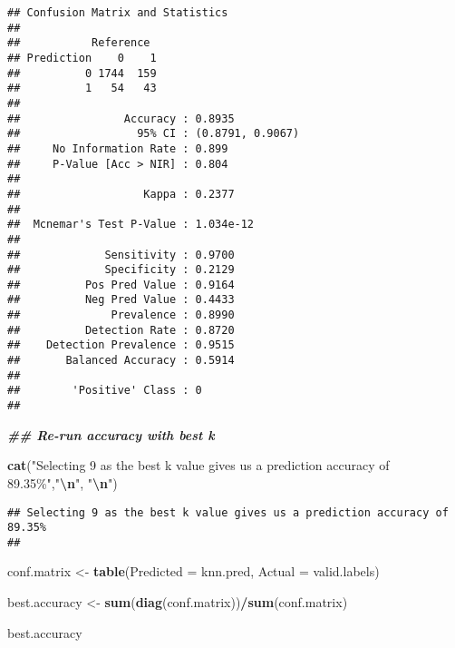 \documentclass[
]{article}
\newenvironment{Shaded}{\begin{snugshade}}{\end{snugshade}}
\newcommand{\AttributeTok}[1]{\textcolor[rgb]{0.13,0.29,0.53}{#1}}
\newcommand{\DocumentationTok}[1]{\textcolor[rgb]{0.56,0.35,0.01}{\textbf{\textit{#1}}}}
\newcommand{\FunctionTok}[1]{\textcolor[rgb]{0.13,0.29,0.53}{\textbf{#1}}}
\newcommand{\NormalTok}[1]{#1}
\newcommand{\OtherTok}[1]{\textcolor[rgb]{0.56,0.35,0.01}{#1}}
\newcommand{\SpecialCharTok}[1]{\textcolor[rgb]{0.81,0.36,0.00}{\textbf{#1}}}
\newcommand{\StringTok}[1]{\textcolor[rgb]{0.31,0.60,0.02}{#1}}
\begin{document}
\begin{verbatim}
## Confusion Matrix and Statistics
## 
##           Reference
## Prediction    0    1
##          0 1744  159
##          1   54   43
##                                           
##                Accuracy : 0.8935          
##                  95% CI : (0.8791, 0.9067)
##     No Information Rate : 0.899           
##     P-Value [Acc > NIR] : 0.804           
##                                           
##                   Kappa : 0.2377          
##                                           
##  Mcnemar's Test P-Value : 1.034e-12       
##                                           
##             Sensitivity : 0.9700          
##             Specificity : 0.2129          
##          Pos Pred Value : 0.9164          
##          Neg Pred Value : 0.4433          
##              Prevalence : 0.8990          
##          Detection Rate : 0.8720          
##    Detection Prevalence : 0.9515          
##       Balanced Accuracy : 0.5914          
##                                           
##        'Positive' Class : 0               
## 
\end{verbatim}

\begin{Shaded}
\begin{Highlighting}[]
\DocumentationTok{\#\# Re{-}run accuracy with best k}

\FunctionTok{cat}\NormalTok{(}\StringTok{"Selecting 9 as the best k value gives us a prediction accuracy of 89.35\%"}\NormalTok{,}\StringTok{"}\SpecialCharTok{\textbackslash{}n}\StringTok{"}\NormalTok{, }\StringTok{"}\SpecialCharTok{\textbackslash{}n}\StringTok{"}\NormalTok{)}
\end{Highlighting}
\end{Shaded}

\begin{verbatim}
## Selecting 9 as the best k value gives us a prediction accuracy of 89.35% 
## 
\end{verbatim}

\begin{Shaded}
\begin{Highlighting}[]
\NormalTok{conf.matrix }\OtherTok{\textless{}{-}} \FunctionTok{table}\NormalTok{(}\AttributeTok{Predicted =}\NormalTok{ knn.pred, }\AttributeTok{Actual =}\NormalTok{ valid.labels)}

\NormalTok{best.accuracy }\OtherTok{\textless{}{-}} \FunctionTok{sum}\NormalTok{(}\FunctionTok{diag}\NormalTok{(conf.matrix))}\SpecialCharTok{/}\FunctionTok{sum}\NormalTok{(conf.matrix)}

\NormalTok{best.accuracy}
\end{Highlighting}
\end{Shaded}
\end{document}
